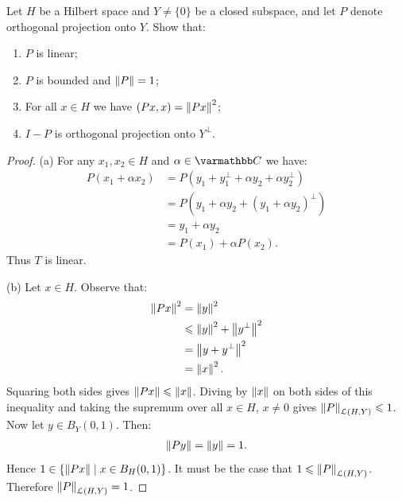\documentclass[10pt,oneside,openany]{memoir}
\begin{document}
\begin{exercise}\label{exercise:projection-norm-eq-1}
Let $H$ be a Hilbert space and $Y \neq \{0\}$ be a closed subspace, and let $P$ denote orthogonal projection onto $Y$. Show that:
    \begin{enumerate}[label = (\arabic*),itemsep=1pt,topsep=3pt]
        \item $P$ is linear;
        \item $P$ is bounded and $\left\lVert P \right\rVert = 1$;
        \item For all $x \in H$ we have $(Px,x) = \left\lVert Px \right\rVert^2$;
        \item $I - P$ is orthogonal projection onto $Y^\perp$.
    \end{enumerate}
\end{exercise}
\begin{proof}
    (a) For any $x_1,x_2 \in H$ and $\alpha \in \bfC$ we have:
        \begin{equation*}
        \begin{split}
            P(x_1 + \alpha x_2) 
            & = P(y_1 + y_1^\perp + \alpha y_2 + \alpha y_2^\perp) \\
            & = P(y_1 + \alpha y_2 + (y_1 + \alpha y_2)^\perp) \\
            & = y_1 + \alpha y_2 \\
            & = P(x_1) + \alpha P(x_2).
        \end{split}
        \end{equation*}
    Thus $T$ is linear.
    
    (b) Let $x \in H$. Observe that:
            \begin{equation*}
            \begin{split}
                \left\lVert Px \right\rVert^2 
                & = \left\lVert y \right\rVert^2 \\
                & \leqslant \left\lVert y \right\rVert^2 + \left\lVert y^\perp \right\rVert^2 \\
                & = \left\lVert y + y^\perp \right\rVert^2 \\
                & = \left\lVert x \right\rVert^2.
            \end{split}
            \end{equation*}
        Squaring both sides gives $\left\lVert Px \right\rVert \leqslant \left\lVert x \right\rVert$. Diving by $\left\lVert x \right\rVert$ on both sides of this inequality and taking the supremum over all $x \in H$, $x \neq 0$ gives $\left\lVert P \right\rVert_{\mathcal{L}(H,Y)} \leqslant 1$. Now let $y \in B_Y(0,1)$. Then:
            \begin{equation*}
            \begin{split}
                \left\lVert Py \right\rVert = \left\lVert y \right\rVert = 1.
            \end{split}
            \end{equation*}
        Hence $1 \in \{\left\lVert Px \right\rVert \mid x \in B_H(0,1)\}$. It must be the case that $1 \leqslant \left\lVert P \right\rVert_{\mathcal{L}(H,Y)}$. Therefore $\left\lVert P \right\rVert_{\mathcal{L}(H,Y)} = 1$.


\end{proof}
\end{document}
